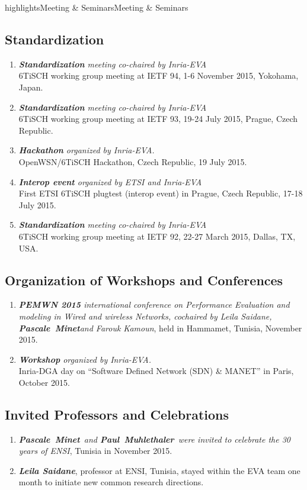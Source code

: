\documentclass{ra2016}
\newcommand{\paul}  {\textbf{Paul~Muhlethaler}}
\newcommand{\pascale} {\textbf{Pascale~Minet}}
\begin{document}
\begin{module}{highlights}{Meeting \& Seminars}{Meeting \& Seminars}
\subsection{Standardization}
\begin{enumerate}
    \item \textit{\textbf{Standardization} meeting co-chaired by Inria-EVA}\\
        6TiSCH working group meeting at IETF 94, 1-6 November 2015, Yokohama, Japan.
    \item \textit{\textbf{Standardization} meeting co-chaired by Inria-EVA}\\
        6TiSCH working group meeting at IETF 93, 19-24 July 2015, Prague, Czech Republic.
    \item \textit{\textbf{Hackathon} organized by Inria-EVA.}\\
        OpenWSN/6TiSCH Hackathon, Czech Republic, 19 July 2015.
    \item \textit{\textbf{Interop event} organized by ETSI and Inria-EVA}\\
        First ETSI 6TiSCH plugtest (interop event) in Prague, Czech Republic, 17-18 July 2015.
    \item \textit{\textbf{Standardization} meeting co-chaired by Inria-EVA}\\
        6TiSCH working group meeting at IETF 92, 22-27 March 2015, Dallas, TX, USA.        
\end{enumerate}

\subsection{Organization of Workshops and Conferences}
\begin{enumerate}
    \item \textit{\textbf{PEMWN 2015} international conference on Performance Evaluation and modeling in Wired and wireless Networks, cochaired by Leila Saidane, \pascale and Farouk Kamoun}, held in Hammamet, Tunisia, November 2015.
    \item \textit{\textbf{Workshop} organized by Inria-EVA.}\\
        Inria-DGA day on ``Software Defined Network (SDN) \& MANET'' in Paris, October 2015.
\end{enumerate}

\subsection{Invited Professors and Celebrations}
\begin{enumerate}
    \item \textit{\pascale~and \paul~were invited to celebrate the 30 years of ENSI}, Tunisia in November 2015.
    \item \textit{\textbf{Leila Saidane}}, professor at ENSI, Tunisia, stayed within the EVA team one month to initiate new common research directions.
\end{enumerate} 

\end{module}
\end{document}
